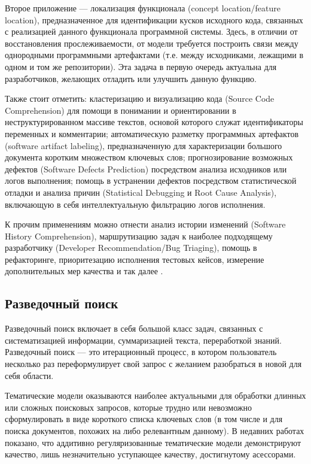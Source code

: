 Второе приложение --- локализация функционала (concept location/feature location), предназначенное для идентификации кусков исходного кода, связанных с реализацией данного функционала программной системы\cite{dit2013feature}. Здесь, в отличии от восстановления прослеживаемости, от модели требуется построить связи между однородными программными артефактами (т.е. между исходниками, лежащими в одном и том же репозитории). Эта задача в первую очередь актуальна для разработчиков, желающих отладить или улучшить данную функцию.

Также стоит отметить: кластеризацию и визуализацию кода  (Source Code Comprehension) для помощи в понимании и ориентировании в неструктурированном массиве текстов, основой которого служат идентификаторы переменных и комментарии; автоматическую разметку программных артефактов (software artifact labeling), предназначенную для характеризации большого документа коротким множеством ключевых слов\cite{de2012using}; прогнозирование возможных дефектов (Software Defects Prediction) посредством анализа исходников или логов выполнения; помощь в  устранении дефектов посредством статистической отладки и анализа причин (Statistical Debugging и Root Cause Analysis), включающую в себя интеллектуальную фильтрацию логов исполнения.

К прочим применениям можно отнести анализ истории изменений (Software History Comprehension), маршрутизацию задач к наиболее подходящему разработчику (Developer Recommendation/Bug Triaging), помощь в рефакторинге, приоритезацию исполнения тестовых кейсов, измерение дополнительных мер качества и так далее \cite{sun2016exploring,chen2016survey}.

\subsection{Разведочный поиск}

Разведочный поиск включает в себя большой класс задач, связанных с систематизацией информации, суммаризацией текста, переработкой знаний. Разведочный поиск --- это итерационный процесс, в котором пользователь несколько раз переформулирует свой запрос с желанием разобраться в новой для себя области. 

Тематические модели оказываются наиболее актуальными для обработки длинных или сложных поисковых запросов, которые трудно  или невозможно сформулировать в виде короткого списка ключевых слов (в том числе и для поиска документов, похожих на либо релевантным данному). В недавних работах \cite{ianina2017multi, ianina2019regularized} показано, что аддитивно регуляризованные тематические модели демонстрируют качество, лишь незначительно уступающее качеству, достигнутому асессорами.

